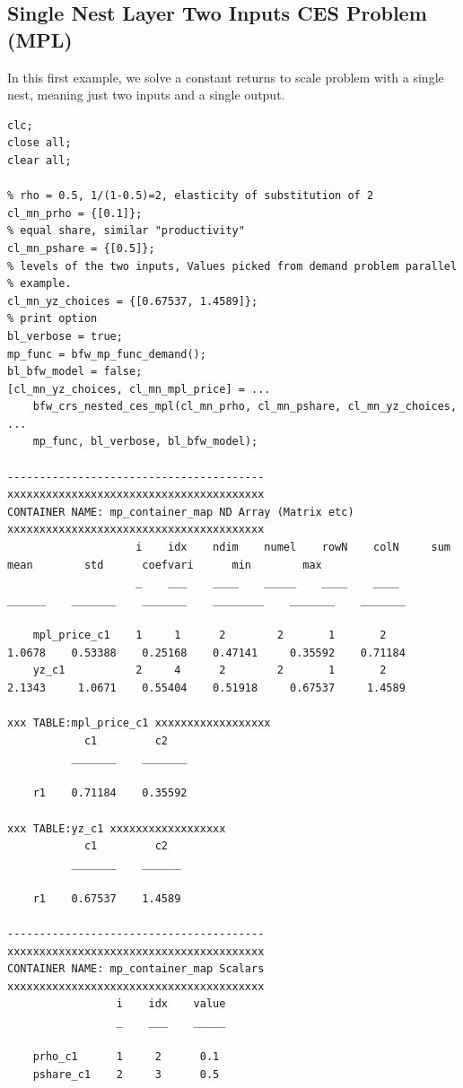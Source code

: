 \documentclass[
]{book}
\begin{document}
\hypertarget{single-nest-layer-two-inputs-ces-problem-mpl}{%
\subsection{Single Nest Layer Two Inputs CES Problem (MPL)}\label{single-nest-layer-two-inputs-ces-problem-mpl}}

In this first example, we solve a constant returns to scale problem with
a single nest, meaning just two inputs and a single output.

\begin{verbatim}
clc;
close all;
clear all;

% rho = 0.5, 1/(1-0.5)=2, elasticity of substitution of 2
cl_mn_prho = {[0.1]};
% equal share, similar "productivity"
cl_mn_pshare = {[0.5]};
% levels of the two inputs, Values picked from demand problem parallel
% example.
cl_mn_yz_choices = {[0.67537, 1.4589]};
% print option
bl_verbose = true;
mp_func = bfw_mp_func_demand();
bl_bfw_model = false;
[cl_mn_yz_choices, cl_mn_mpl_price] = ...
    bfw_crs_nested_ces_mpl(cl_mn_prho, cl_mn_pshare, cl_mn_yz_choices, ...
    mp_func, bl_verbose, bl_bfw_model);

----------------------------------------
xxxxxxxxxxxxxxxxxxxxxxxxxxxxxxxxxxxxxxxx
CONTAINER NAME: mp_container_map ND Array (Matrix etc)
xxxxxxxxxxxxxxxxxxxxxxxxxxxxxxxxxxxxxxxx
                    i    idx    ndim    numel    rowN    colN     sum       mean        std      coefvari      min        max  
                    _    ___    ____    _____    ____    ____    ______    _______    _______    ________    _______    _______

    mpl_price_c1    1     1      2        2       1       2      1.0678    0.53388    0.25168    0.47141     0.35592    0.71184
    yz_c1           2     4      2        2       1       2      2.1343     1.0671    0.55404    0.51918     0.67537     1.4589

xxx TABLE:mpl_price_c1 xxxxxxxxxxxxxxxxxx
            c1         c2   
          _______    _______

    r1    0.71184    0.35592

xxx TABLE:yz_c1 xxxxxxxxxxxxxxxxxx
            c1         c2  
          _______    ______

    r1    0.67537    1.4589

----------------------------------------
xxxxxxxxxxxxxxxxxxxxxxxxxxxxxxxxxxxxxxxx
CONTAINER NAME: mp_container_map Scalars
xxxxxxxxxxxxxxxxxxxxxxxxxxxxxxxxxxxxxxxx
                 i    idx    value
                 _    ___    _____

    prho_c1      1     2      0.1 
    pshare_c1    2     3      0.5 
\end{verbatim}
\end{document}
